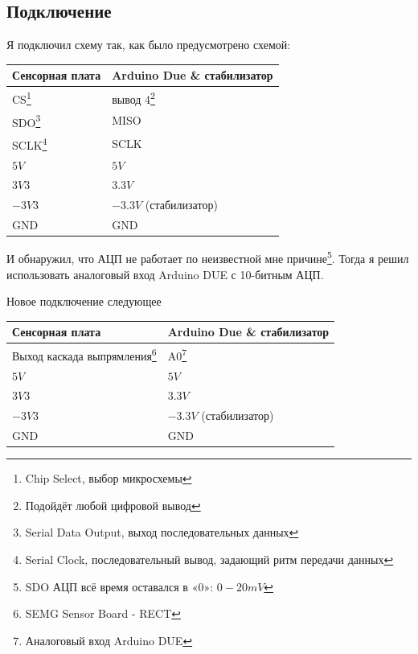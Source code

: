 \documentclass[a4paper, 10pt, final]{article} %
\begin{document}
    \subsection{Подключение}
    Я подключил схему так, как было предусмотрено схемой:
    \begin{center}
    \begin{tabular}{ ||l|l|| }
        \hline
        \multicolumn{1}{||l|}{Сенсорная плата} & \multicolumn{1}{|l||}{Arduino Due \& стабилизатор} \\
        \hline
        \hline
        CS\footnote{Chip Select, выбор микросхемы} & вывод 4\footnote{Подойдёт любой цифровой вывод}\\
        \hline
        SDO\footnote{Serial Data Output, выход последовательных данных} & MISO\\
        \hline
        SCLK\footnote{Serial Clock, последовательный вывод, задающий ритм передачи данных} & SCLK\\
        \hline
        $5V$   & $5V$\\
        \hline
        $3V3$  & $3.3V$\\
        \hline
        $-3V3$ & $-3.3V$ (стабилизатор)\\
        \hline
        GND    & GND\\
        \hline
    \end{tabular}
    \end{center}
    \noindent И обнаружил, что АЦП не работает по неизвестной мне причине\footnote{SDO АЦП всё время оставался в «$0$»: $0-20mV$}.
    Тогда я решил использовать аналоговый вход Arduino DUE с 10-битным АЦП.

    \noindent Новое подключение следующее
    \begin{center}
        \begin{tabular}{ ||l|l|| }
            \hline
            \multicolumn{1}{||l|}{Сенсорная плата} & \multicolumn{1}{|l||}{Arduino Due \& стабилизатор} \\
            \hline
            \hline
            Выход каскада выпрямления\footnote{SEMG Sensor Board - RECT} & A0\footnote{Аналоговый вход Arduino DUE}\\
            \hline
            $5V$   & $5V$\\
            \hline
            $3V3$  & $3.3V$\\
            \hline
            $-3V3$ & $-3.3V$ (стабилизатор)\\
            \hline
            GND    & GND\\
            \hline
        \end{tabular}
    \end{center}
\end{document}
